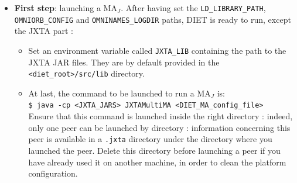 \begin{itemize}

  \item{\textbf{First step}: launching a MA$_{J}$. After having set
      the \texttt{LD\_LIBRARY\_PATH}, \\ \texttt{OMNIORB\_CONFIG} and
      \texttt{OMNINAMES\_LOGDIR} paths, DIET is ready to run, except
      the JXTA part :}
    \begin{itemize}
      \item{Set an environment variable called \texttt{JXTA\_LIB}
      containing the path to the JXTA JAR files. They are by default
      provided in the \texttt{<diet\_root>/src/lib} directory.}

  \item{At last, the command to be launched to run a MA$_{J}$ is:\\
      \noindent
      {\footnotesize \texttt{\$ java -cp <JXTA\_JARS> JXTAMultiMA
          <DIET\_MA\_config\_file>} } \\Ensure that this command is
      launched inside the right directory : indeed, only one peer can
      be launched by directory : information concerning this peer is
      available in a \texttt{.jxta} directory under the directory
      where you launched the peer.  Delete this directory before
      launching a peer if you have already used it on another machine,
      in order to clean the platform configuration.}
    \end{itemize}
    

\end{itemize}
